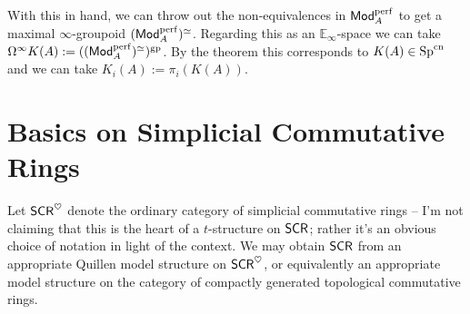 \documentclass[11pt]{article}
\newcommand{\E}{\mathbb{E}}
\DeclareMathOperator{\cn}{cn} %
\DeclareMathOperator{\gp}{gp} %
\DeclareMathOperator{\perf}{perf} %
\begin{document}
With this in hand, we can throw out the non-equivalences in $\Mod_A^{\perf}$ to get a maximal $\infty$-groupoid $(\Mod_A^{\perf})^{\simeq}$. Regarding this as an $\E_{\infty}$-space we can take $\Omega^{\infty}K(A):=((\Mod_A^{\perf})^{\simeq})^{\gp}$. By the theorem this corresponds to $K(A)\in\Sp^{\cn}$ and we can take $K_i(A):=\pi_i(K(A))$.

\section{Basics on Simplicial Commutative Rings}
Let $\operatorname{\mathsf{SCR}}^{\heartsuit}$ denote the ordinary category of simplicial commutative rings -- I'm not claiming that this is the heart of a $t$-structure on $\operatorname{\mathsf{SCR}}$; rather it's an obvious choice of notation in light of the context. We may obtain $\operatorname{\mathsf{SCR}}$ from an appropriate Quillen model structure on $\operatorname{\mathsf{SCR}}^{\heartsuit}$, or equivalently an appropriate model structure on the category of compactly generated topological commutative rings. 
\end{document}
